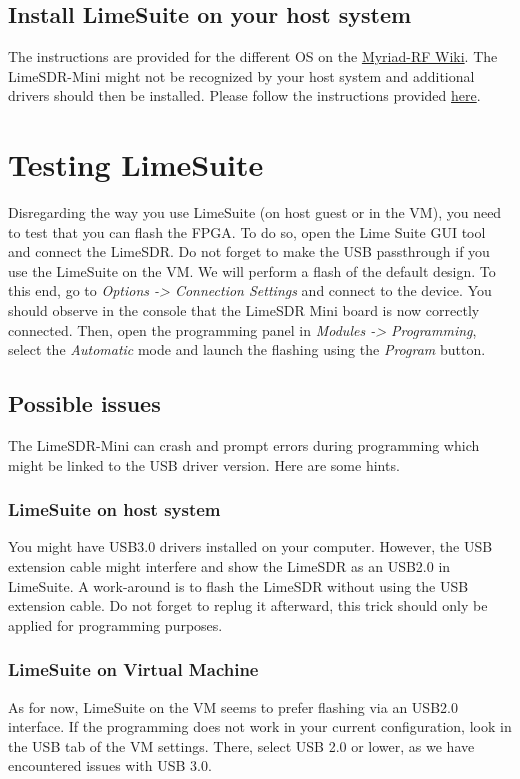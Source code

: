 \subsection{Install LimeSuite on your host system}

The instructions are provided for the different OS on the \href{http://wiki.myriadrf.org/Lime_Suite}{Myriad-RF Wiki}. The LimeSDR-Mini might not be recognized by your host system and additional drivers should then be installed. Please follow the instructions provided \href{https://wiki.myriadrf.org/LimeSDR_Windows_Driver_Installation}{here}.




\section{Testing LimeSuite}

Disregarding the way you use LimeSuite (on host guest or in the VM), you need to test that you can flash the FPGA. To do so, open the Lime Suite GUI tool and connect the LimeSDR. Do not forget to make the USB passthrough if you use the LimeSuite on the VM. We will perform a flash of the default design. To this end, go to \textit{Options -> Connection Settings} and connect to the device. You should observe in the console that the LimeSDR Mini board is now correctly connected. Then, open the programming panel in \textit{Modules -> Programming}, select the \textit{Automatic} mode and launch the flashing using the \textit{Program} button.

\subsection{Possible issues}
The LimeSDR-Mini can crash and prompt errors during programming which might be linked to the USB driver version. Here are some hints.

\subsubsection{LimeSuite on host system}
You might have USB3.0 drivers installed on your computer. However, the USB extension cable might interfere and show the LimeSDR as an USB2.0 in LimeSuite. A work-around is to flash the LimeSDR without using the USB extension cable. Do not forget to replug it afterward, this trick should only be applied for programming purposes.


\subsubsection{LimeSuite on Virtual Machine}
As for now, LimeSuite on the VM seems to prefer flashing via an USB2.0 interface. If the programming does not work in your current configuration, look in the USB tab of the VM settings. There, select USB 2.0 or lower, as we have encountered issues with USB 3.0.


